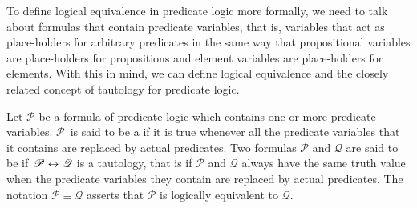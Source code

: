 To define logical equivalence in predicate logic more formally,
we need to talk about formulas that contain predicate variables,
that is, variables that act as place-holders for arbitrary predicates
in the same way that propositional variables are place-holders for
propositions and element variables are place-holders for
elements.  With this in mind, we can define logical equivalence
and the closely related concept of tautology for predicate logic.

\begin{definition}
Let $\mathscr{P}$ be a formula of predicate logic which contains one or more
predicate variables.  $\mathscr{P}$~is said to be a 
if it is true whenever all the predicate variables that it contains are replaced
by actual predicates.  Two formulas $\mathscr{P}$ and $\mathscr{Q}$ are
said to be  if $\mathscr{P}\leftrightarrow\mathscr{Q}$ is
a tautology, that is if $\mathscr{P}$ and $\mathscr{Q}$ always have the same
truth value when the predicate variables they contain are replaced by actual
predicates.  The notation $\mathscr{P}\equiv\mathscr{Q}$ asserts that
$\mathscr{P}$ is logically equivalent to $\mathscr{Q}$.
\end{definition}




